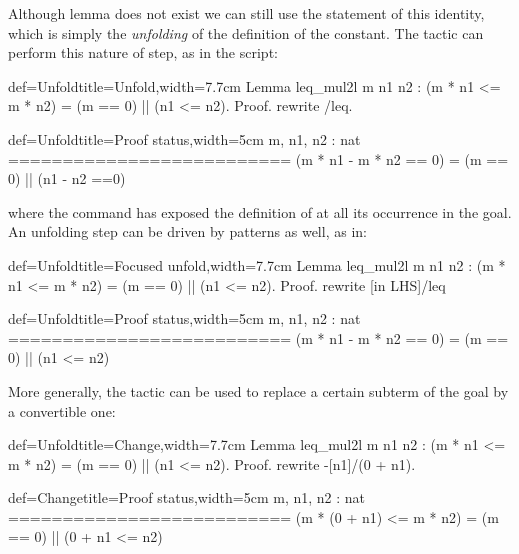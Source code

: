 Although lemma  does not exist we can still use the
statement of this identity, which is simply the \emph{unfolding} of
the definition of the  constant. The  tactic can
perform this nature of step, as in the script:

\begin{coq}{def=Unfold}{title=Unfold,width=7.7cm}
Lemma leq_mul2l m n1 n2 :
(m * n1 <= m * n2) = (m == 0) || (n1 <= n2).
Proof.
rewrite /leq.
\end{coq}
\begin{coqout}{def=Unfold}{title=Proof status,width=5cm}
m, n1, n2 : nat
==========================
(m * n1 - m * n2 == 0) =
(m == 0) || (n1 - n2 ==0)
\end{coqout}

where the command  has exposed the definition of
 at all its occurrence in the goal. An unfolding step can be
driven by patterns as well, as in:

\begin{coq}{def=Unfold}{title=Focused unfold,width=7.7cm}
Lemma leq_mul2l m n1 n2 :
(m * n1 <= m * n2) = (m == 0) || (n1 <= n2).
Proof.
rewrite [in LHS]/leq
\end{coq}
\begin{coqout}{def=Unfold}{title=Proof status,width=5cm}
m, n1, n2 : nat
==========================
(m * n1 - m * n2 == 0) =
(m == 0) || (n1 <= n2)
\end{coqout}

More generally, the  tactic can be used to replace a
certain subterm of the goal by a convertible one:

\begin{coq}{def=Unfold}{title=Change,width=7.7cm}
Lemma leq_mul2l m n1 n2 :
(m * n1 <= m * n2) = (m == 0) || (n1 <= n2).
Proof.
rewrite -[n1]/(0 + n1).
\end{coq}
\begin{coqout}{def=Change}{title=Proof status,width=5cm}
m, n1, n2 : nat
==========================
(m * (0 + n1) <= m * n2) =
(m == 0) || (0 + n1 <= n2)
\end{coqout}





